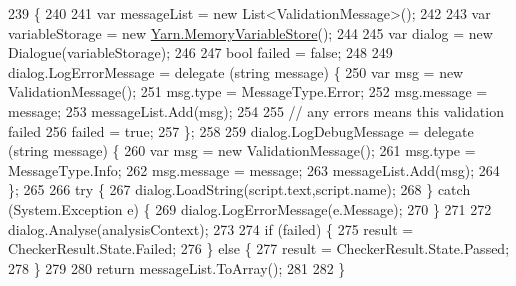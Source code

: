 \begin{DoxyCode}
239                                                                                                            
                        \{
240 
241             var messageList = \textcolor{keyword}{new} List<ValidationMessage>();
242 
243             var variableStorage = \textcolor{keyword}{new} \hyperlink{a00066}{Yarn.MemoryVariableStore}();
244 
245             var dialog = \textcolor{keyword}{new} Dialogue(variableStorage);
246 
247             \textcolor{keywordtype}{bool} failed = \textcolor{keyword}{false};
248 
249             dialog.LogErrorMessage = delegate (\textcolor{keywordtype}{string} message) \{
250                 var msg = \textcolor{keyword}{new} ValidationMessage();
251                 msg.type = MessageType.Error;
252                 msg.message = message;
253                 messageList.Add(msg);
254 
255                 \textcolor{comment}{// any errors means this validation failed}
256                 failed = \textcolor{keyword}{true};
257             \};
258 
259             dialog.LogDebugMessage = delegate (\textcolor{keywordtype}{string} message) \{
260                 var msg = \textcolor{keyword}{new} ValidationMessage();
261                 msg.type = MessageType.Info;
262                 msg.message = message;
263                 messageList.Add(msg);
264             \};
265 
266             \textcolor{keywordflow}{try} \{
267                 dialog.LoadString(script.text,script.name);
268             \} \textcolor{keywordflow}{catch} (System.Exception e) \{
269                 dialog.LogErrorMessage(e.Message);
270             \}
271 
272             dialog.Analyse(analysisContext);
273 
274             \textcolor{keywordflow}{if} (failed) \{
275                 result = CheckerResult.State.Failed;
276             \} \textcolor{keywordflow}{else} \{
277                 result = CheckerResult.State.Passed;
278             \}
279 
280             \textcolor{keywordflow}{return} messageList.ToArray();
281 
282         \}
\end{DoxyCode}


